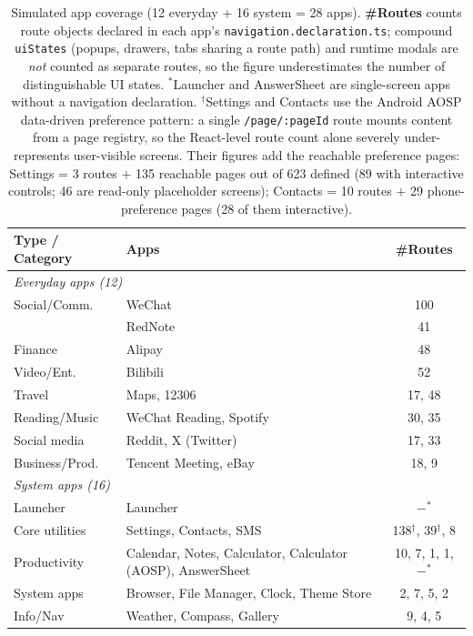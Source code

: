 \begin{table}[!htbp]
  \centering\small
  \setlength{\tabcolsep}{3pt}
  \begin{tabular}{lp{2.7cm}c}
    \toprule
    \textbf{Type / Category} & \textbf{Apps} & \textbf{\#Routes} \\
    \midrule
    \multicolumn{3}{l}{\textit{Everyday apps (12)}} \\
    Social/Comm.    & WeChat       & 100 \\
                    & RedNote      & 41 \\
    Finance         & Alipay       & 48 \\
    Video/Ent.      & Bilibili     & 52 \\
    Travel          & Maps, 12306  & 17, 48 \\
    Reading/Music   & WeChat Reading, Spotify & 30, 35 \\
    Social media    & Reddit, X (Twitter) & 17, 33 \\
    Business/Prod.  & Tencent Meeting, eBay & 18, 9 \\
    \midrule
    \multicolumn{3}{l}{\textit{System apps (16)}} \\
    Launcher        & Launcher     & $-^\ast$ \\
    Core utilities  & Settings, Contacts, SMS & 138$^\dagger$, 39$^\dagger$, 8 \\
    Productivity    & Calendar, Notes, Calculator, Calculator (AOSP), AnswerSheet & 10, 7, 1, 1, $-^\ast$ \\
    System apps     & Browser, File Manager, Clock, Theme Store & 2, 7, 5, 2 \\
    Info/Nav        & Weather, Compass, Gallery & 9, 4, 5 \\
    \bottomrule
  \end{tabular}
  \caption{Simulated app coverage (12 everyday + 16 system = 28 apps). \textbf{\#Routes} counts route objects declared in each app's \texttt{navigation.declaration.ts}; compound \texttt{uiStates} (popups, drawers, tabs sharing a route path) and runtime modals are \textit{not} counted as separate routes, so the figure underestimates the number of distinguishable UI states. $^\ast$Launcher and AnswerSheet are single-screen apps without a navigation declaration. $^\dagger$Settings and Contacts use the Android AOSP data-driven preference pattern: a single \texttt{/page/:pageId} route mounts content from a page registry, so the React-level route count alone severely under-represents user-visible screens. Their figures add the reachable preference pages: Settings = 3 routes $+$ 135 reachable pages out of 623 defined (89 with interactive controls; 46 are read-only placeholder screens); Contacts = 10 routes $+$ 29 phone-preference pages (28 of them interactive).}
  \label{tab:apps}
\end{table}

